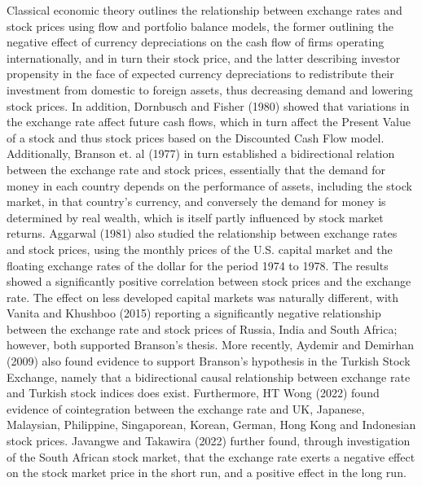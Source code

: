 \documentclass[12pt,a4paper]{article}
\begin{document}
Classical economic theory outlines the relationship between exchange rates and stock prices using flow and portfolio balance models, the former outlining the negative effect of currency depreciations on the cash flow of firms operating internationally, and in turn their stock price, and the latter describing investor propensity in the face of expected currency depreciations to redistribute their investment from domestic to foreign assets, thus decreasing demand and lowering stock prices. In addition, Dornbusch and Fisher (1980) showed that variations in the exchange rate affect future cash flows, which in turn affect the Present Value of a stock and thus stock prices based on the Discounted Cash Flow model. Additionally, Branson et. al (1977) in turn established a bidirectional relation between the exchange rate and stock prices, essentially that the demand for money in each country depends on the performance of assets, including the stock market, in that country’s currency, and conversely the demand for money is determined by real wealth, which is itself partly influenced by stock market returns. Aggarwal (1981) also studied the relationship between exchange rates and stock prices, using the monthly prices of the U.S. capital market and the floating exchange rates of the dollar for the period 1974 to 1978. The results showed a significantly positive correlation between stock prices and the exchange rate. The effect on less developed capital markets was naturally different, with Vanita and Khushboo (2015) reporting a significantly negative relationship between the exchange rate and stock prices of Russia, India and South Africa; however, both supported Branson’s thesis.  More recently, Aydemir and Demirhan (2009) also found evidence to support Branson’s hypothesis in the Turkish Stock Exchange, namely that a bidirectional causal relationship between exchange rate and Turkish stock indices does exist. Furthermore, HT Wong (2022) found evidence of cointegration between the exchange rate and UK, Japanese, Malaysian, Philippine, Singaporean, Korean, German, Hong Kong and Indonesian stock prices. Javangwe and Takawira (2022) further found, through investigation of the South African stock market, that the exchange rate exerts a negative effect on the stock market price in the short run, and a positive effect in the long run. 
\end{document}
